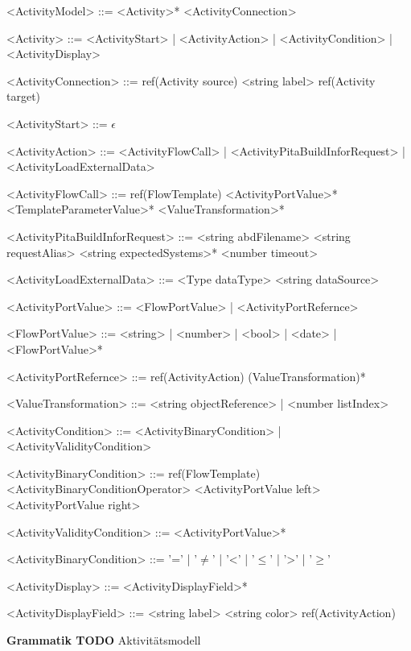 \documentclass{article}
\begin{document}
    \begin{grammar}
        <ActivityModel> ::= <Activity>* <ActivityConnection>

        <Activity> ::= <ActivityStart>
        | <ActivityAction>
        | <ActivityCondition>
        | <ActivityDisplay>

        <ActivityConnection> ::= ref(Activity source) <string label> ref(Activity target)

        <ActivityStart> ::= $\epsilon$

        <ActivityAction> ::= <ActivityFlowCall>
        | <ActivityPitaBuildInforRequest>
        | <ActivityLoadExternalData>

        <ActivityFlowCall> ::= ref(FlowTemplate) <ActivityPortValue>* <TemplateParameterValue>* <ValueTransformation>*

        <ActivityPitaBuildInforRequest> ::= <string abdFilename> <string requestAlias> <string expectedSystems>* <number timeout>

        <ActivityLoadExternalData> ::= <Type dataType> <string dataSource>

        <ActivityPortValue> ::= <FlowPortValue>
        | <ActivityPortRefernce>

        <FlowPortValue> ::= <string>
        | <number>
        | <bool>
        | <date>
        | <FlowPortValue>*

        <ActivityPortRefernce> ::= ref(ActivityAction) (ValueTransformation)*

        <ValueTransformation> ::= <string objectReference>
        | <number listIndex>

        <ActivityCondition> ::= <ActivityBinaryCondition>
        | <ActivityValidityCondition>

        <ActivityBinaryCondition> ::= ref(FlowTemplate) <ActivityBinaryConditionOperator> <ActivityPortValue left> <ActivityPortValue right>

        <ActivityValidityCondition> ::= <ActivityPortValue>*

        <ActivityBinaryCondition> ::= '='
        | '$\neq$' 
        | '\textless' 
        | '$\leq$' 
        | '\textgreater' 
        | '$\geq$'

        <ActivityDisplay> ::= <ActivityDisplayField>*

        <ActivityDisplayField> ::= <string label> <string color> ref(ActivityAction)
    \end{grammar}
    \textbf{Grammatik TODO} Aktivitätsmodell
    \newpage
\end{document}

